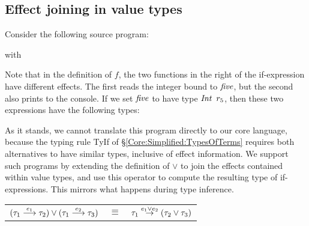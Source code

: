 
\clearpage{}
\subsection{Effect joining in value types}

Consider the following source program:


\quad with


Note that in the definition of $f$, the two functions in the right of the if-expression have different effects. The first reads the integer bound to $\operatorname{\mathit{five}}$, but the second also prints to the console. If we set $\operatorname{\mathit{five}}$ to have type $\operatorname{\mathit{Int}} \ r_5$, then these two expressions have the following types:



As it stands, we cannot translate this program directly to our core language, because the typing rule TyIf of \S\ref{Core:Simplified:TypesOfTerms} requires both alternatives to have similar types, inclusive of effect information. We support such programs by extending the definition of $\lor$ to join the effects contained within value types, and use this operator to compute the resulting type of if-expressions. This mirrors what happens during type inference.

\quad
\begin{tabular}{rll}
	$(\tau_{1} \stackrel{e_1}{\longrightarrow} \tau_{2}) \lor (\tau_{1} \stackrel{e_2}{\longrightarrow} \tau_{3})$
		& $\equiv$	& $\tau_{1} \stackrel{e_1 \lor e_2}{\rightarrow} (\tau_{2} \lor \tau_{3})$		
\end{tabular}

